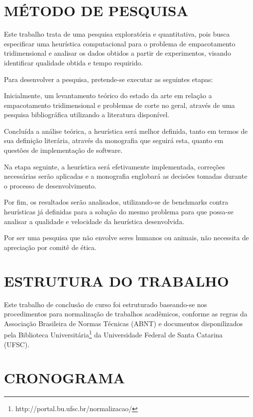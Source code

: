 \documentclass{ufscThesis}
\begin{document}
\chapter{MÉTODO DE PESQUISA}
Este trabalho trata de uma pesquisa exploratória e quantitativa, pois busca especificar uma heurística computacional para o problema de empacotamento tridimensional e analisar os dados obtidos a partir de experimentos, visando identificar qualidade obtida e tempo requirido.

Para desenvolver a pesquisa, pretende-se executar as seguintes etapas:

Inicialmente, um levantamento teórico do estado da arte em relação a empacotamento tridimensional e problemas de corte no geral, através de uma pesquisa bibliográfica utilizando a literatura disponível.

Concluída a análise teórica, a heurística será melhor definida, tanto em termos de sua definição literária, através da monografia que seguirá esta, quanto em questões de implementação de software.

Na etapa seguinte, a heurística será efetivamente implementada, correções necessárias serão aplicadas e a monografia englobará as decisões tomadas durante o processo de desenvolvimento.

Por fim, os resultados serão analisados, utilizando-se de benchmarks contra heurísticas já definidas para a solução do mesmo problema para que possa-se analisar a qualidade e velocidade da heurística desenvolvida.


Por ser uma pesquisa que não envolve seres humanos ou animais, não necessita de apreciação por comitê de ética.

\chapter{ESTRUTURA DO TRABALHO}
Este trabalho de conclusão de curso foi estruturado baseando-se nos procedimentos para normalização de trabalhos acadêmicos, conforme as regras da Associação Brasileira de Normas Técnicas (ABNT) e documentos disponilizados pela Biblioteca Universitária\footnote{http://portal.bu.ufsc.br/normalizacao/} da Universidade Federal de Santa Catarina (UFSC).

\chapter{CRONOGRAMA}
\end{document}
